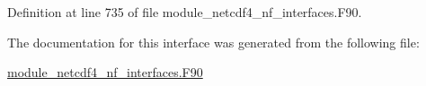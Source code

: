 Definition at line 735 of file module\+\_\+netcdf4\+\_\+nf\+\_\+interfaces.\+F90.



The documentation for this interface was generated from the following file\+:\begin{DoxyCompactItemize}
\item 
\hyperlink{module__netcdf4__nf__interfaces_8F90}{module\+\_\+netcdf4\+\_\+nf\+\_\+interfaces.\+F90}\end{DoxyCompactItemize}
